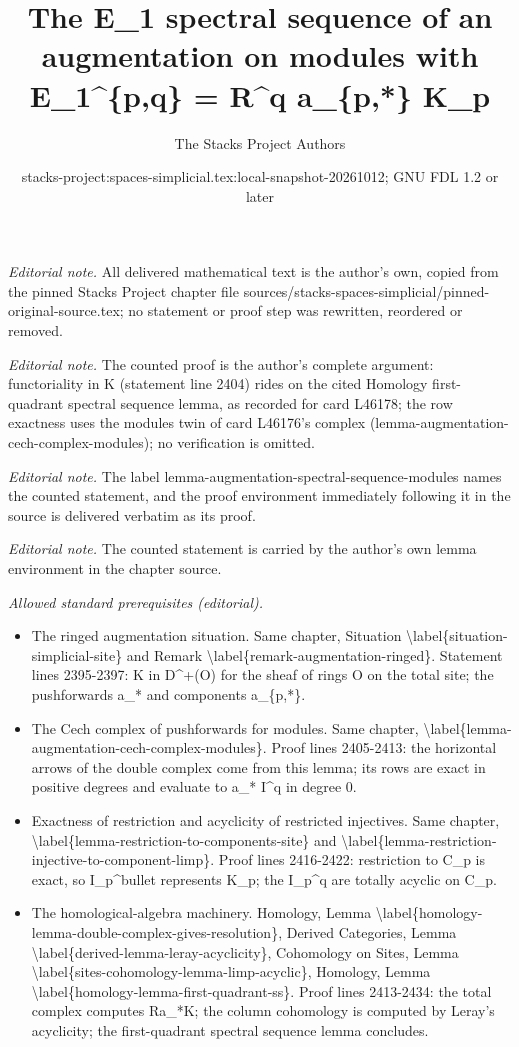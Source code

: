 \documentclass{stacks-project}
\title{The E\_1 spectral sequence of an augmentation on modules with E\_1\textasciicircum{}\{p,q\} = R\textasciicircum{}q a\_\{p,*\} K\_p}
\author{The Stacks Project Authors}
\date{stacks-project:spaces-simplicial.tex:local-snapshot-20261012; GNU FDL 1.2 or later}
\theoremstyle{plain}
\theoremstyle{definition}
\theoremstyle{remark}
\numberwithin{equation}{subsection}
\begin{document}
\maketitle
\noindent\textit{Editorial note.} All delivered mathematical text is the author's own, copied from the pinned Stacks Project chapter file sources/stacks-spaces-simplicial/pinned-original-source.tex; no statement or proof step was rewritten, reordered or removed.\par\medskip
\noindent\textit{Editorial note.} The counted proof is the author's complete argument: functoriality in K (statement line 2404) rides on the cited Homology first-quadrant spectral sequence lemma, as recorded for card L46178; the row exactness uses the modules twin of card L46176's complex (lemma-augmentation-cech-complex-modules); no verification is omitted.\par\medskip
\noindent\textit{Editorial note.} The label lemma-augmentation-spectral-sequence-modules names the counted statement, and the proof environment immediately following it in the source is delivered verbatim as its proof.\par\medskip
\noindent\textit{Editorial note.} The counted statement is carried by the author's own lemma environment in the chapter source.\par\medskip
\noindent\textit{Allowed standard prerequisites (editorial).}\begin{itemize}
\item The ringed augmentation situation. Same chapter, Situation \textbackslash{}label\{situation-simplicial-site\} and Remark \textbackslash{}label\{remark-augmentation-ringed\}. Statement lines 2395-2397: K in D\textasciicircum{}+(O) for the sheaf of rings O on the total site; the pushforwards a\_* and components a\_\{p,*\}.
\item The Cech complex of pushforwards for modules. Same chapter, \textbackslash{}label\{lemma-augmentation-cech-complex-modules\}. Proof lines 2405-2413: the horizontal arrows of the double complex come from this lemma; its rows are exact in positive degrees and evaluate to a\_* I\textasciicircum{}q in degree 0.
\item Exactness of restriction and acyclicity of restricted injectives. Same chapter, \textbackslash{}label\{lemma-restriction-to-components-site\} and \textbackslash{}label\{lemma-restriction-injective-to-component-limp\}. Proof lines 2416-2422: restriction to C\_p is exact, so I\_p\textasciicircum{}bullet represents K\_p; the I\_p\textasciicircum{}q are totally acyclic on C\_p.
\item The homological-algebra machinery. Homology, Lemma \textbackslash{}label\{homology-lemma-double-complex-gives-resolution\}, Derived Categories, Lemma \textbackslash{}label\{derived-lemma-leray-acyclicity\}, Cohomology on Sites, Lemma \textbackslash{}label\{sites-cohomology-lemma-limp-acyclic\}, Homology, Lemma \textbackslash{}label\{homology-lemma-first-quadrant-ss\}. Proof lines 2413-2434: the total complex computes Ra\_*K; the column cohomology is computed by Leray's acyclicity; the first-quadrant spectral sequence lemma concludes.
\end{itemize}\medskip
\end{document}

